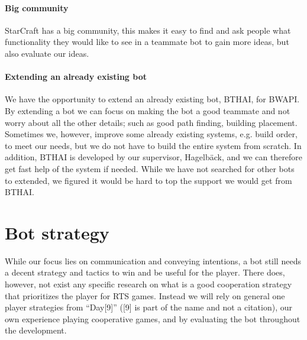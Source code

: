 \paragraph{Big community} StarCraft has a big community, this makes it easy to find and ask people
what functionality they would like to see in a teammate bot to gain more ideas, but also evaluate
our ideas.

\paragraph{Extending an already existing bot} We have the opportunity to extend an already existing
bot, BTHAI\cite{bthai}, for BWAPI\cite{bwapi}. By extending a bot we can focus on making the bot a
good teammate and not worry about all the other details; such as good path finding, building
placement. Sometimes we, however, improve some already existing systems, e.g. build order, to meet
our needs, but we do not have to build the entire system from scratch. In addition, BTHAI is
developed by our supervisor, Hagelbäck, and we can therefore get fast help of the system if needed.
While we have not searched for other bots to extended, we figured it would be hard to top the
support we would get from BTHAI.

\section{Bot strategy} While our focus lies on communication and conveying intentions, a bot still
needs a decent strategy and tactics to win and be useful for the player. There does, however, not
exist any specific research on what is a good cooperation strategy that prioritizes the player for
RTS games. Instead we will rely on general one player strategies from
``Day[9]''\cite{day9} ([9] is part of the name and not a citation), our own experience playing
cooperative games, and by evaluating the bot throughout the development.
